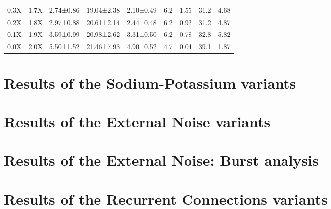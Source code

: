 \begin{table}[htbp]
\begin{adjustbox}{width=\textwidth}
\begin{tabular}{ccccccccc}
            0.3X       & 1.7X        & 2.74±0.86                     & 19.04±2.38 & 2.10±0.49 & 6.2 & 1.55 & 31.2 & 4.68 \\
            0.2X       & 1.8X        & 2.97±0.88                     & 20.61±2.14 & 2.44±0.48 & 6.2 & 0.92 & 31.2 & 4.87 \\
            0.1X       & 1.9X        & 3.59±0.99                     & 20.98±2.62 & 3.31±0.50 & 6.2 & 0.78 & 32.8 & 5.82 \\
            0.0X       & 2.0X        & 5.50±1.52                     & 21.46±7.93 & 4.90±0.52 & 4.7 & 0.04 & 39.1 & 1.87 \\
            \hline
        \end{tabular}
    \end{adjustbox}
\end{table}

\section{Results of the Sodium-Potassium variants}

\section{Results of the External Noise variants}

\section{Results of the External Noise: Burst analysis}

\section{Results of the Recurrent Connections variants}

